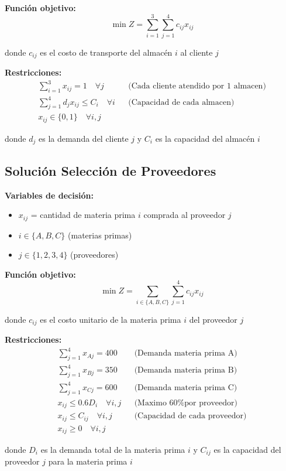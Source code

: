 \documentclass[12pt]{article}
\begin{document}
\textbf{Función objetivo:}
$$\min Z = \sum_{i=1}^{3} \sum_{j=1}^{4} c_{ij} x_{ij}$$
\begin{center}
donde $c_{ij}$ es el costo de transporte del almacén $i$ al cliente $j$
\end{center}

\textbf{Restricciones:}
\begin{align*}
    \sum_{i=1}^{3} x_{ij} = 1 \quad \forall j && \text{(Cada cliente atendido por 1 almacen)} \\
    \sum_{j=1}^{4} d_j x_{ij} \leq C_i \quad \forall i && \text{(Capacidad de cada almacen)} \\
    x_{ij} \in \{0,1\} \quad \forall i,j
\end{align*}
\begin{center}
donde $d_j$ es la demanda del cliente $j$ y $C_i$ es la capacidad del almacén $i$
\end{center}

\subsection{Solución Selección de Proveedores}

\textbf{Variables de decisión:}
\begin{itemize}
    \item $x_{ij}$ = cantidad de materia prima $i$ comprada al proveedor $j$
    \item $i \in \{A, B, C\}$ (materias primas)
    \item $j \in \{1, 2, 3, 4\}$ (proveedores)
\end{itemize}

\textbf{Función objetivo:}
$$\min Z = \sum_{i \in \{A,B,C\}} \sum_{j=1}^{4} c_{ij} x_{ij}$$
\begin{center}
donde $c_{ij}$ es el costo unitario de la materia prima $i$ del proveedor $j$
\end{center}

\textbf{Restricciones:}
\begin{align*}
    \sum_{j=1}^{4} x_{Aj} = 400 && \text{(Demanda materia prima A)} \\
    \sum_{j=1}^{4} x_{Bj} = 350 && \text{(Demanda materia prima B)} \\
    \sum_{j=1}^{4} x_{Cj} = 600 && \text{(Demanda materia prima C)} \\
    x_{ij} \leq 0.6D_i \quad \forall i,j && \text{(Maximo 60\% por proveedor)} \\
    x_{ij} \leq C_{ij} \quad \forall i,j && \text{(Capacidad de cada proveedor)} \\
    x_{ij} \geq 0 \quad \forall i,j
\end{align*}
\begin{center}
donde $D_i$ es la demanda total de la materia prima $i$ y $C_{ij}$ es la capacidad del proveedor $j$ para la materia prima $i$
\end{center}
\end{document}
